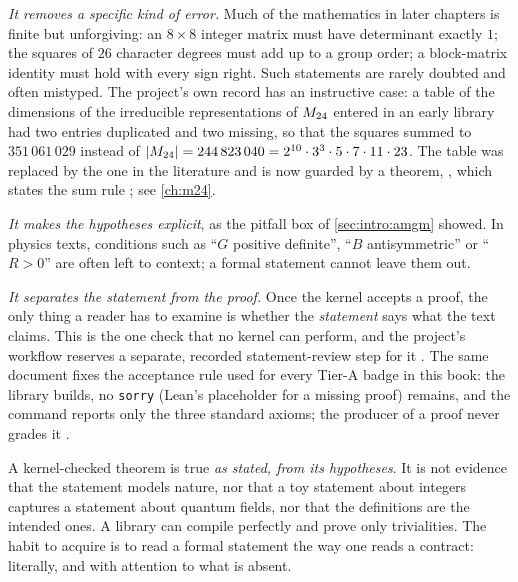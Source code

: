 \emph{It removes a specific kind of error.} Much of the mathematics in later chapters is
finite but unforgiving: an $8\times8$ integer matrix must have determinant exactly $1$; the
squares of $26$ character degrees must add up to a group order; a block-matrix identity must
hold with every sign right. Such statements are rarely doubted and often mistyped. The
project's own record has an instructive case: a table of the dimensions of the irreducible
representations of $M_{24}$ entered in an early library had two entries duplicated and two
missing, so that the squares summed to $351\,061\,029$ instead of $|M_{24}|=244\,823\,040
=2^{10}\cdot3^3\cdot5\cdot7\cdot11\cdot23$. The table was replaced by the one in the literature
and is now guarded by a theorem, , which states the sum rule
; see \cref{ch:m24}.

\emph{It makes the hypotheses explicit}, as the pitfall box of \cref{sec:intro:amgm} showed.
In physics texts, conditions such as ``$G$ positive definite'', ``$B$ antisymmetric'' or
``$R>0$'' are often left to context; a formal statement cannot leave them out.

\emph{It separates the statement from the proof.} Once the kernel accepts a proof, the only
thing a reader has to examine is whether the \emph{statement} says what the text claims.
This is the one check that no kernel can perform, and the project's workflow reserves a
separate, recorded statement-review step for it .
The same document fixes the acceptance rule used for every Tier-A badge in this book: the
library builds, no \texttt{sorry} (Lean's placeholder for a missing proof) remains, and the
command  reports only the three standard axioms; the producer of a proof
never grades it .

\begin{pitfallbox}
A kernel-checked theorem is true \emph{as stated, from its hypotheses}. It is not evidence
that the statement models nature, nor that a toy statement about integers captures a
statement about quantum fields, nor that the definitions are the intended ones. A library can
compile perfectly and prove only trivialities. The habit to acquire is to read a formal
statement the way one reads a contract: literally, and with attention to what is absent.
\end{pitfallbox}

